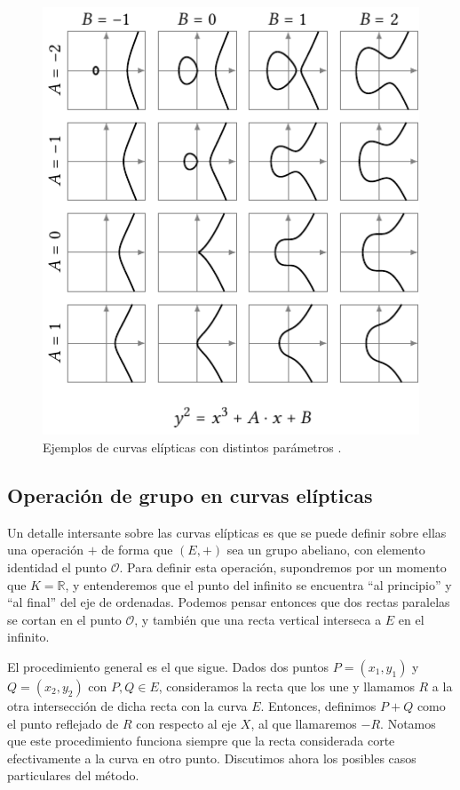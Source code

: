 \documentclass[
  a4paper,
  12pt,
  spanish,
]{scrartcl}
\begin{document}
\begin{figure}[h]
  \centering
  \includegraphics[width=.75\textwidth]{img/parametros-curvas}
  \caption{Ejemplos de curvas elípticas con distintos parámetros \parencite{eichlseder_elliptic_2016}.}
  \label{fig:parametros}
\end{figure}


\subsection{Operación de grupo en curvas elípticas}

Un detalle intersante sobre las curvas elípticas es que se puede definir sobre ellas una operación $+$ de forma que $(E, +)$ sea un grupo abeliano, con elemento identidad el punto $\mathcal{O}$. Para definir esta operación, supondremos por un momento que $K = \mathbb{R}$, y entenderemos que el punto del infinito se encuentra ``al principio'' y ``al final'' del eje de ordenadas. Podemos pensar entonces que dos rectas paralelas se cortan en el punto $\mathcal{O}$, y también que una recta vertical interseca a $E$ en el infinito.

    El procedimiento general es el que sigue. Dados dos puntos $P = (x_1, y_1)$ y $Q = (x_2, y_2)$ con $P,Q \in E$, consideramos la recta que los une y llamamos $R$ a la otra intersección de dicha recta con la curva $E$. Entonces, definimos $P + Q$ como el punto reflejado de $R$ con respecto al eje $X$, al que llamaremos $-R$. Notamos que este procedimiento funciona siempre que la recta considerada corte efectivamente a la curva en otro punto. Discutimos ahora los posibles casos particulares del método.
    
\end{document}
